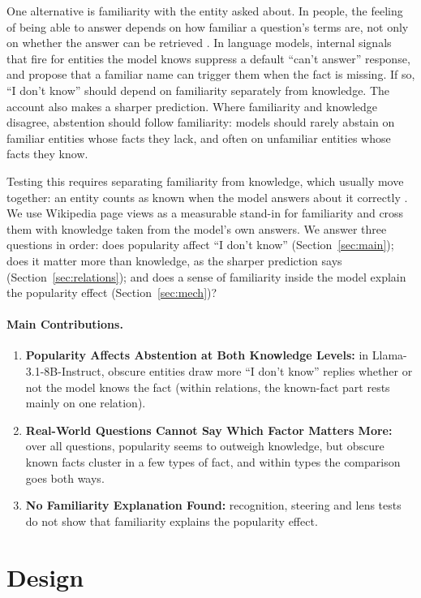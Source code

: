 \documentclass[11pt]{article}
\newcommand{\idk}{``I don't know''}
\begin{document}
One alternative is familiarity with the entity asked about. In people, the feeling of being able to answer depends on how familiar a question's terms are, not only on whether the answer can be retrieved \citep{reder1992,koriat2001cascade}. In language models, internal signals that fire for entities the model knows suppress a default ``can't answer'' response, and \citet{lindsey2025biology} propose that a familiar name can trigger them when the fact is missing. If so, \idk{} should depend on familiarity separately from knowledge. The account also makes a sharper prediction. Where familiarity and knowledge disagree, abstention should follow familiarity: models should rarely abstain on familiar entities whose facts they lack, and often on unfamiliar entities whose facts they know.

Testing this requires separating familiarity from knowledge, which usually move together: an entity counts as known when the model answers about it correctly \citep{ferrando2025iknow}. We use Wikipedia page views as a measurable stand-in for familiarity and cross them with knowledge taken from the model's own answers. We answer three questions in order: does popularity affect \idk{} (Section~\ref{sec:main}); does it matter more than knowledge, as the sharper prediction says (Section~\ref{sec:relations}); and does a sense of familiarity inside the model explain the popularity effect (Section~\ref{sec:mech})?

\paragraph{Main Contributions.}
\begin{enumerate}
\item \textbf{Popularity Affects Abstention at Both Knowledge Levels:} in Llama-3.1-8B-Instruct, obscure entities draw more \idk{} replies whether or not the model knows the fact (within relations, the known-fact part rests mainly on one relation).
\item \textbf{Real-World Questions Cannot Say Which Factor Matters More:} over all questions, popularity seems to outweigh knowledge, but obscure known facts cluster in a few types of fact, and within types the comparison goes both ways.
\item \textbf{No Familiarity Explanation Found:} recognition, steering and lens tests do not show that familiarity explains the popularity effect.
\end{enumerate}

\section{Design}
\label{sec:setup}
\end{document}
